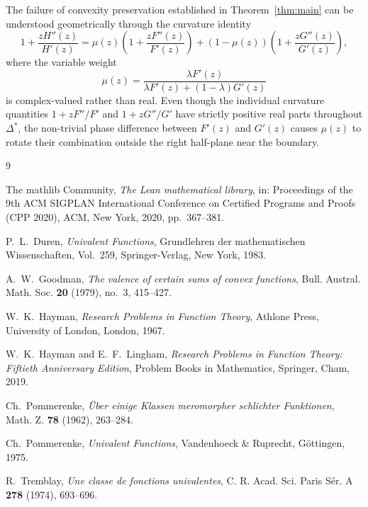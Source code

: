 \documentclass[11pt,reqno]{amsart}
\theoremstyle{definition}
\begin{document}
The failure of convexity preservation established in Theorem~\ref{thm:main} can be understood geometrically through the curvature identity
\begin{equation}
1 + \frac{z H''(z)}{H'(z)} = \mu(z) \left(1 + \frac{z F''(z)}{F'(z)}\right) + (1 - \mu(z)) \left(1 + \frac{z G''(z)}{G'(z)}\right),
\end{equation}
where the variable weight
\begin{equation}
\mu(z) = \frac{\lambda F'(z)}{\lambda F'(z) + (1-\lambda) G'(z)}
\end{equation}
is complex-valued rather than real. Even though the individual curvature quantities $1 + z F''/F'$ and $1 + z G''/G'$ have strictly positive real parts throughout $\Delta^*$, the non-trivial phase difference between $F'(z)$ and $G'(z)$ causes $\mu(z)$ to rotate their combination outside the right half-plane near the boundary.

\begin{thebibliography}{9}

The mathlib Community, \emph{The Lean mathematical library}, in: Proceedings of the 9th ACM SIGPLAN International Conference on Certified Programs and Proofs (CPP 2020), ACM, New York, 2020, pp.~367--381.

P.~L.~Duren, \emph{Univalent Functions}, Grundlehren der mathematischen Wissenschaften, Vol.~259, Springer-Verlag, New York, 1983.

A.~W.~Goodman, \emph{The valence of certain sums of convex functions}, Bull. Austral. Math. Soc. \textbf{20} (1979), no.~3, 415--427.

W.~K.~Hayman, \emph{Research Problems in Function Theory}, Athlone Press, University of London, London, 1967.

W.~K.~Hayman and E.~F.~Lingham, \emph{Research Problems in Function Theory: Fiftieth Anniversary Edition}, Problem Books in Mathematics, Springer, Cham, 2019.

Ch.~Pommerenke, \emph{\"Uber einige Klassen meromorpher schlichter Funktionen}, Math. Z. \textbf{78} (1962), 263--284.

Ch.~Pommerenke, \emph{Univalent Functions}, Vandenhoeck \& Ruprecht, G\"ottingen, 1975.

R.~Tremblay, \emph{Une classe de fonctions univalentes}, C. R. Acad. Sci. Paris S\'er. A \textbf{278} (1974), 693--696.

\end{thebibliography}
\end{document}
